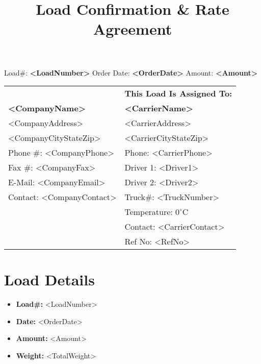 \documentclass[11pt]{article}
\title{Load Confirmation \& Rate Agreement}
\author{}
\date{}
\begin{document}
\maketitle

\begin{center}
Load\#: \textbf{<LoadNumber>} \hfill Order Date: \textbf{<OrderDate>} \hfill Amount: \textbf{<Amount>}
\end{center}

\vspace{0.5cm}

\begin{tabular}{|p{5.5in}|p{5.5in}|}
\hline
\rowcolor{lightgray} \multicolumn{1}{|c|}{\textbf{Company:}} & \multicolumn{1}{c|}{\textbf{This Load Is Assigned To:}} \\
\textbf{<CompanyName>} & \textbf{<CarrierName>} \\
<CompanyAddress> & <CarrierAddress> \\
<CompanyCityStateZip> & <CarrierCityStateZip> \\
Phone \#: <CompanyPhone> & Phone: <CarrierPhone> \\
Fax \#: <CompanyFax> & Driver 1: <Driver1> \\
E-Mail: <CompanyEmail> & Driver 2: <Driver2> \\
Contact: <CompanyContact> & Truck\#: <TruckNumber> \\
 & Temperature: $0^{\circ} \mathrm{C}$ \\
 & Contact: <CarrierContact> \\
 & Ref No: <RefNo> \\
\hline
\end{tabular}

\vspace{0.5cm}

\section*{Load Details}
\begin{itemize}[leftmargin=*,label={}]
    \item \textbf{Load\#:} <LoadNumber>
    \item \textbf{Date:} <OrderDate>
    \item \textbf{Amount:} <Amount>
    \item \textbf{Weight:} <TotalWeight>
\end{itemize}

\end{document}
